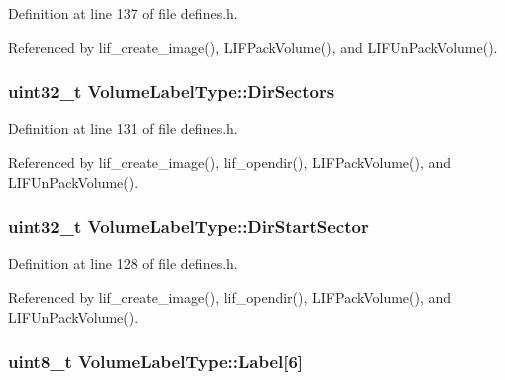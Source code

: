 Definition at line 137 of file defines.\+h.



Referenced by lif\+\_\+create\+\_\+image(), L\+I\+F\+Pack\+Volume(), and L\+I\+F\+Un\+Pack\+Volume().

\subsubsection[{\texorpdfstring{Dir\+Sectors}{DirSectors}}]{\setlength{\rightskip}{0pt plus 5cm}uint32\+\_\+t Volume\+Label\+Type\+::\+Dir\+Sectors}\hypertarget{structVolumeLabelType_a11e35931a035c61cddc1fa20898e9466}{}\label{structVolumeLabelType_a11e35931a035c61cddc1fa20898e9466}


Definition at line 131 of file defines.\+h.



Referenced by lif\+\_\+create\+\_\+image(), lif\+\_\+opendir(), L\+I\+F\+Pack\+Volume(), and L\+I\+F\+Un\+Pack\+Volume().

\subsubsection[{\texorpdfstring{Dir\+Start\+Sector}{DirStartSector}}]{\setlength{\rightskip}{0pt plus 5cm}uint32\+\_\+t Volume\+Label\+Type\+::\+Dir\+Start\+Sector}\hypertarget{structVolumeLabelType_aa74d0d5a4d248e42b2eb2fb95dcad4a6}{}\label{structVolumeLabelType_aa74d0d5a4d248e42b2eb2fb95dcad4a6}


Definition at line 128 of file defines.\+h.



Referenced by lif\+\_\+create\+\_\+image(), lif\+\_\+opendir(), L\+I\+F\+Pack\+Volume(), and L\+I\+F\+Un\+Pack\+Volume().

\subsubsection[{\texorpdfstring{Label}{Label}}]{\setlength{\rightskip}{0pt plus 5cm}uint8\+\_\+t Volume\+Label\+Type\+::\+Label\mbox{[}6\mbox{]}}\hypertarget{structVolumeLabelType_ad8724768576a8eb4d697597ae9b90c21}{}\label{structVolumeLabelType_ad8724768576a8eb4d697597ae9b90c21}


